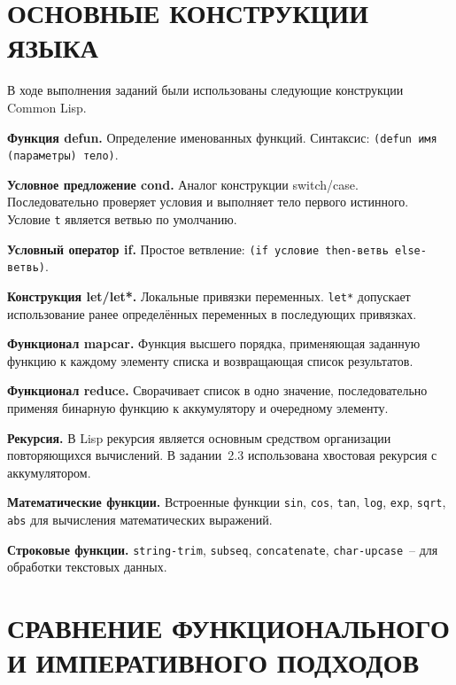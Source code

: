 \documentclass[14pt,a4paper]{extarticle}
\begin{document}
\newpage

\section{ОСНОВНЫЕ КОНСТРУКЦИИ ЯЗЫКА}

В ходе выполнения заданий были использованы следующие конструкции Common Lisp.

\textbf{Функция defun.} Определение именованных функций. Синтаксис: \texttt{(defun имя (параметры) тело)}.

\textbf{Условное предложение cond.} Аналог конструкции switch/case. Последовательно проверяет условия и выполняет тело первого истинного. Условие \texttt{t} является ветвью по умолчанию.

\textbf{Условный оператор if.} Простое ветвление: \texttt{(if условие then-ветвь else-ветвь)}.

\textbf{Конструкция let/let*.} Локальные привязки переменных. \texttt{let*} допускает использование ранее определённых переменных в последующих привязках.

\textbf{Функционал mapcar.} Функция высшего порядка, применяющая заданную функцию к каждому элементу списка и возвращающая список результатов.

\textbf{Функционал reduce.} Сворачивает список в одно значение, последовательно применяя бинарную функцию к аккумулятору и очередному элементу.

\textbf{Рекурсия.} В Lisp рекурсия является основным средством организации повторяющихся вычислений. В задании~2.3 использована хвостовая рекурсия с аккумулятором.

\textbf{Математические функции.} Встроенные функции \texttt{sin}, \texttt{cos}, \texttt{tan}, \texttt{log}, \texttt{exp}, \texttt{sqrt}, \texttt{abs} для вычисления математических выражений.

\textbf{Строковые функции.} \texttt{string-trim}, \texttt{subseq}, \texttt{concatenate}, \texttt{char-upcase}~-- для обработки текстовых данных.

\newpage

\section{СРАВНЕНИЕ ФУНКЦИОНАЛЬНОГО И ИМПЕРАТИВНОГО ПОДХОДОВ}
\end{document}
